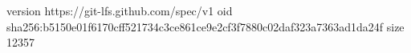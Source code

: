 version https://git-lfs.github.com/spec/v1
oid sha256:b5150e01f6170cff521734c3ce861ce9e2cf3f7880c02daf323a7363ad1da24f
size 12357
